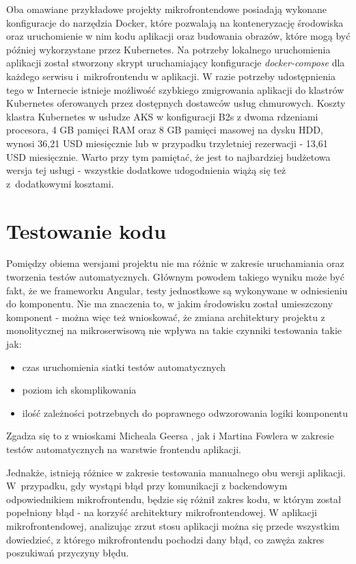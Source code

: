 \documentclass{SGGW-thesis}
\begin{document}
  Oba omawiane przykładowe projekty mikrofrontendowe posiadają wykonane konfiguracje do narzędzia Docker, które pozwalają na konteneryzację środowiska oraz uruchomienie w nim kodu aplikacji oraz budowania obrazów, które mogą być później wykorzystane przez Kubernetes. Na potrzeby lokalnego uruchomienia aplikacji został stworzony skrypt uruchamiający konfiguracje \textit{docker-compose} dla każdego serwisu i~mikrofrontendu w aplikacji. W razie potrzeby udostępnienia tego w Internecie istnieje możliwość szybkiego zmigrowania aplikacji do klastrów Kubernetes oferowanych przez dostępnych dostawców usług chmurowych. Koszty klastra Kubernetes w usłudze AKS \cite{aks_calc} w konfiguracji B2s z dwoma rdzeniami procesora, 4 GB pamięci RAM oraz 8 GB pamięci masowej na dysku HDD, wynosi 36,21 USD miesięcznie lub w przypadku trzyletniej rezerwacji - 13,61 USD miesięcznie. Warto przy tym pamiętać, że jest to najbardziej budżetowa wersja tej usługi - wszystkie dodatkowe udogodnienia wiążą się też z~dodatkowymi kosztami.

  \section{Testowanie kodu}
  Pomiędzy obiema wersjami projektu nie ma różnic w zakresie uruchamiania oraz tworzenia testów automatycznych. Głównym powodem takiego wyniku może być fakt, że we frameworku Angular, testy jednostkowe są wykonywane w odniesieniu do komponentu. Nie ma znaczenia to, w jakim środowisku został umieszczony komponent - można więc też wnioskować, że zmiana architektury projektu z monolitycznej na mikroserwisową nie wpływa na takie czynniki testowania takie jak:
  
  \begin{itemize}
    \item czas uruchomienia siatki testów automatycznych
    \item poziom ich skomplikowania
    \item ilość zależności potrzebnych do poprawnego odwzorowania logiki komponentu
  \end{itemize}

  Zgadza się to z wnioskami Micheala Geersa \cite{geers_2020}, jak i Martina Fowlera \cite{fowler_2019} w zakresie testów automatycznych na warstwie frontendu aplikacji.

  Jednakże, istnieją różnice w zakresie testowania manualnego obu wersji aplikacji. W~przypadku, gdy wystąpi błąd przy komunikacji z backendowym odpowiednikiem mikrofrontendu, będzie się różnił zakres kodu, w którym został popełniony błąd - na korzyść architektury mikrofrontendowej. W aplikacji mikrofrontendowej, analizując zrzut stosu aplikacji można się przede wszystkim dowiedzieć, z którego mikrofrontendu pochodzi dany błąd, co zawęża zakres poszukiwań przyczyny błędu.
\end{document}
